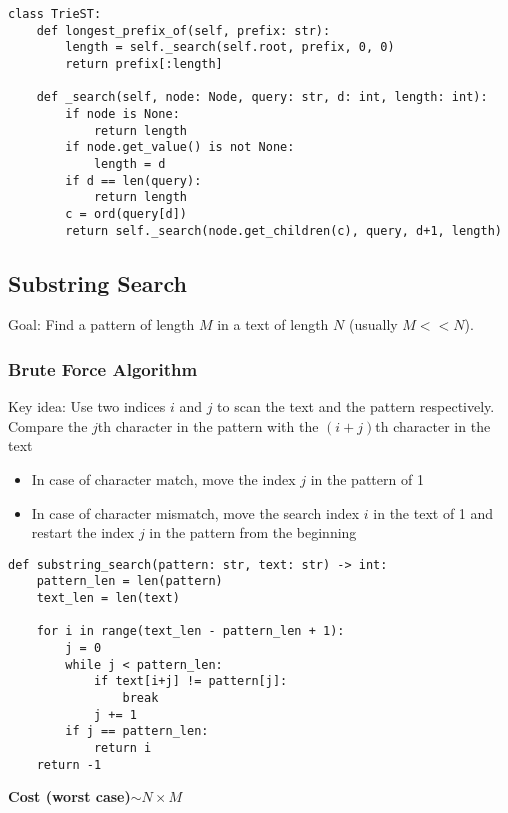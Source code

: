 \documentclass[a4paper]{article}
\begin{document}
\begin{lstlisting}
class TrieST:
    def longest_prefix_of(self, prefix: str):
        length = self._search(self.root, prefix, 0, 0)
        return prefix[:length]

    def _search(self, node: Node, query: str, d: int, length: int):
        if node is None:
            return length
        if node.get_value() is not None:
            length = d
        if d == len(query):
            return length
        c = ord(query[d])
        return self._search(node.get_children(c), query, d+1, length)
\end{lstlisting}

\subsection{Substring Search}
Goal: Find a pattern of length $M$ in a text of length $N$ (usually $M<<N$).

\subsubsection*{Brute Force Algorithm}
Key idea: Use two indices $i$ and $j$ to scan the text and the pattern respectively. Compare the $j$th character in the pattern with the $(i+j)$th character in the text
\begin{itemize}
    \item In case of character match, move the index $j$ in the pattern of 1
    \item In case of character mismatch, move the search index $i$ in the text of 1 and restart the index $j$ in the pattern from the beginning
\end{itemize}

\begin{lstlisting}
def substring_search(pattern: str, text: str) -> int:
    pattern_len = len(pattern)
    text_len = len(text)

    for i in range(text_len - pattern_len + 1):
        j = 0
        while j < pattern_len:
            if text[i+j] != pattern[j]:
                break
            j += 1
        if j == pattern_len:
            return i
    return -1
\end{lstlisting}
\textbf{Cost (worst case)$\sim N\times M$}
\end{document}
